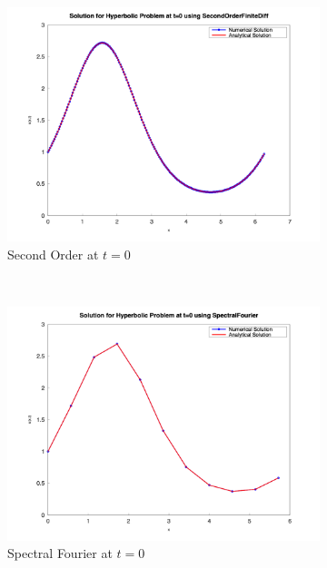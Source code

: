 \begin{figure}[H]
	\centering
	\begin{subfigure}{0.5\textwidth}
		\includegraphics[width=\textwidth]{media/hyperbolic_SecondOrderFiniteDiff_0.png}
		\caption{Second Order at $t=0$}
		\label{sfig:sublabel1}
	\end{subfigure}%
	~
	\begin{subfigure}{0.5\textwidth}
		\includegraphics[width=\textwidth]{media/hyperbolic_SpectralFourier_0.png}
		\caption{Spectral Fourier at $t=0$}
		\label{sfig:sublabel2}
	\end{subfigure}\\
	\begin{subfigure}{0.5\textwidth}

\end{subfigure}
\end{figure}
